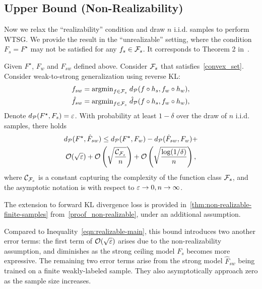 \subsection{Upper Bound (Non-Realizability)}

Now we relax the ``realizability'' condition and draw $n$ i.i.d. samples to perform WTSG.
We provide the result in the ``unrealizable'' setting, where the condition $F_s = F^\star$ may not be satisfied for any $f_s \in \mathcal{F}_s$.
It corresponds to Theorem 2 in~\citet{charikar2024quantifying}.

\begin{theorem} \label{thm:non-realizable-finite-samples-main}
Given $F^\star$, $F_w$ and $F_{sw}$ defined above.
Consider $\mathcal{F}_s$ that satisfies~\cref{convex_set}.
Consider weak-to-strong generalization using reverse KL:
\begin{align*}
    & f_{sw} = \text{argmin}_{f \in \mathcal{F}_{s}}\; d_\mathcal{P}(f \circ h_s, f_w \circ h_w),
    \\ & \hat{f}_{sw} = \text{argmin}_{f \in \mathcal{F}_{s}}\; \hat{d}_{\mathcal{P}}(f \circ h_s, f_w \circ h_w),
\end{align*}
Denote $d_\mathcal{P}(F^\star, F_s) = \varepsilon$. 
With probability at least $1-\delta$ over the draw of $n$ i.i.d. samples, there holds
\begin{multline} 
d_\mathcal{P}(F^\star, \hat{F}_{sw}) \le d_\mathcal{P}(F^\star, F_w) - d_\mathcal{P}(\hat{F}_{sw}, F_w) + \\ \mathcal{O}(\sqrt{\varepsilon}) +  \mathcal{O}\left(\sqrt{\frac{\mathcal{C}_{\mathcal{F}_s}}{n}}\right) + \mathcal{O}\left(\sqrt{\frac{\log(1/\delta)}{n}}\right),
\end{multline}
where $\mathcal{C}_{\mathcal{F}_s}$ is a constant capturing the complexity of the function class $\mathcal{F}_s$, and the asymptotic notation is with respect to $\varepsilon \to 0, n \to \infty$.
\end{theorem}

\begin{remark}
    The extension to forward KL divergence loss is provided in~\cref{thm:non-realizable-finite-samples} from~\cref{proof_non-realizable}, under an additional assumption.
\end{remark}


Compared to Inequality~\eqref{eqn:realizable-main}, this bound introduces two another error terms: the first term of $\mathcal{O}(\sqrt{\varepsilon})$ arises due to the non-realizability assumption, and diminishes as the strong ceiling model $F_s$ becomes more expressive.
The remaining two error terms arise from the strong model $\hat{F}_{sw}$ being trained on a finite weakly-labeled sample. They also asymptotically approach zero as the sample size increases.







